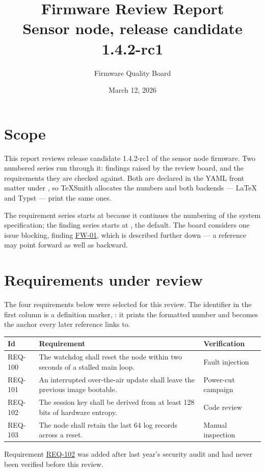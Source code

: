 \documentclass[a4paper,twoside]{article}
\title{Firmware Review Report\\[0.5em]\large Sensor node, release candidate 1.4.2-rc1}
\author{Firmware Quality Board}\date{March 12, 2026}
\begin{document}
\maketitle
\tableofcontents
\section{Scope}
This report reviews release candidate 1.4.2-rc1 of the sensor node firmware.
Two numbered series run through it: findings raised by the review board, and
the requirements they are checked against. Both are declared in the YAML front
matter under , so TeXSmith allocates the numbers and both backends ---
\LaTeX{} and Typst --- print the same ones.

The requirement series starts at  because it continues the numbering of
the system specification; the finding series starts at , the default. The
board considers one issue blocking, finding \hyperref[fw:watchdog]{FW-01}, which is described
further down --- a reference may point forward as well as backward.
\section{Requirements under review}
The four requirements below were selected for this review. The identifier in
the first column is a definition marker, : it prints the
formatted number and becomes the anchor every later reference links to.
\begin{center}
\begin{tabularx}{\linewidth}{>{\raggedright\arraybackslash}X>{\raggedright\arraybackslash}X>{\raggedright\arraybackslash}X}
\toprule
\textbf{Id} & \textbf{Requirement} & \textbf{Verification} \\
\midrule
\leavevmode{}\label{req:watchdog-reset}REQ-100 & The watchdog shall reset the node within two seconds of a stalled main loop. & Fault injection \\
\leavevmode{}\label{req:ota-rollback}REQ-101 & An interrupted over-the-air update shall leave the previous image bootable. & Power-cut campaign \\
\leavevmode{}\label{req:key-entropy}REQ-102 & The session key shall be derived from at least 128 bits of hardware entropy. & Code review \\
\leavevmode{}\label{req:log-retention}REQ-103 & The node shall retain the last 64 log records across a reset. & Manual inspection \\
\bottomrule
\end{tabularx}
\end{center}
Requirement \hyperref[req:key-entropy]{REQ-102} was added after last year's security audit and had
never been verified before this review.
\end{document}
